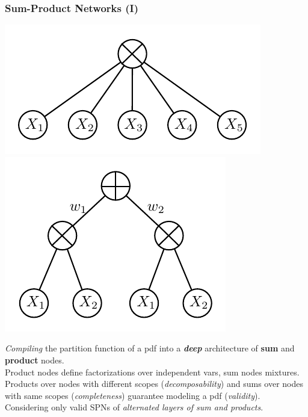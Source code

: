\documentclass[xcolor={usenames,dvipsnames,svgnames}, compress]{beamer}
\begin{document}
\begin{frame}[t]
  \frametitle{Sum-Product Networks (I)}
  \begin{minipage}{0.45\linewidth}
    \centering
    \includegraphics[width=0.8\linewidth]{figures/spn-prod}\\
    \includegraphics[width=0.73\linewidth]{figures/spn-sum}
  \end{minipage}%
  \begin{minipage}{0.5\linewidth}
    \vspace{0pt}
    \footnotesize
    \emph{Compiling} the partition function of a pdf into a \textbf{\emph{deep}} architecture of \textbf{sum}
    and \textbf{product} nodes.\\

    Product nodes define factorizations over independent vars, sum
    nodes mixtures.\\


    Products over nodes with different scopes (\emph{decomposability}) and
    sums over nodes with same scopes (\emph{completeness}) guarantee modeling
    a pdf (\emph{validity}).\\

    Considering only valid SPNs of \emph{alternated layers of sum and products}.

    

    

  \end{minipage}
\end{frame}
\end{document}
